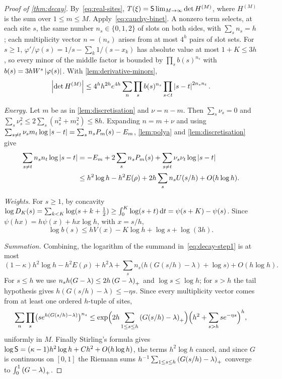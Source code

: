 \begin{proof}[Proof of \cref{thm:decay}]
By~\eqref{eq:real-sites}, $T(\xi)=\mathsf{S}\lim_{M\to\infty}\det H^{(M)}$, where $H^{(M)}$ is the sum
over $1\le m\le M$. Apply~\eqref{eq:cauchy-binet}. A nonzero term selects, at each site $s$, the
same number $n_s\in\{0,1,2\}$ of slots on both sides, with $\sum_sn_s=h$; each multiplicity
vector $n=(n_s)$ arises from at most $4^h$ pairs of slot sets. For $s\ge1$,
$\varphi'/\varphi(s)=1/s-\sum_k1/(s-x_k)$ has absolute value at most $1+K\le3h$, so every minor of
the middle factor is bounded by $\prod_sb(s)^{n_s}$ with $b(s)=3hW^s\left\lvert \varphi(s)\right\rvert$. With
\cref{lem:derivative-minors},
\begin{equation}\label{eq:decay-step1}
  \left\lvert \det H^{(M)}\right\rvert\le4^hh^{2h}e^{4h}\sum_n\prod_sb(s)^{n_s}\prod_{s<t}\left\lvert s-t\right\rvert^{2n_sn_t}.
\end{equation}

\emph{Energy.} Let $m$ be as in \cref{lem:discretisation} and $\nu=n-m$. Then $\sum_s\nu_s=0$ and
$\sum_s\nu_s^2\le2\sum_s(n_s^2+m_s^2)\le8h$. Expanding $n=m+\nu$ and using
$\sum_{s\ne t}\nu_sm_t\log\left\lvert s-t\right\rvert=\sum_sn_sP_m(s)-E_m$, \cref{lem:polya} and
\cref{lem:discretisation} give
\begin{align*}
  \sum_{s\ne t}n_sn_t\log\left\lvert s-t\right\rvert
  &=-E_m+2\sum_sn_sP_m(s)+\sum_{s\ne t}\nu_s\nu_t\log\left\lvert s-t\right\rvert\\
  &\le h^2\log h-h^2E(\rho)+2h\sum_sn_sU(s/h)+O(h\log h).
\end{align*}

\emph{Weights.} For $s\ge1$, by concavity
$\log D_K(s)=\sum_{k<K}\log(s+k+\frac12)\ge\int_0^K\log(s+t)\,\mathrm{d} t=\psi(s+K)-\psi(s)$. Since
$\psi(hx)=h\psi(x)+hx\log h$, with $x=s/h$,
\[
  \log b(s)\le hV(x)-K\log h+\log s+\log(3h).
\]

\emph{Summation.} Combining, the logarithm of the summand in~\eqref{eq:decay-step1} is at most
\[
  (1-\kappa)h^2\log h-h^2E(\rho)+h^2\lambda+\sum_sn_s\bigl(h(G(s/h)-\lambda)+\log s\bigr)+O(h\log h).
\]
For $s\le h$ we use $n_sh(G-\lambda)\le2h\left(G-\lambda\right)_{+}$ and $\log s\le\log h$; for $s>h$ the
tail hypothesis gives $h(G(s/h)-\lambda)\le-\eta s$. Since every multiplicity vector comes from at
least one ordered $h$-tuple of sites,
\[
  \sum_n\prod_s\bigl(se^{h(G(s/h)-\lambda)}\bigr)^{n_s}\le
  \exp\Bigl(2h\sum_{1\le s\le h}\left(G(s/h)-\lambda\right)_{+}\Bigr)\Bigl(h^2+\sum_{s>h}se^{-\eta s}\Bigr)^h,
\]
uniformly in $M$. Finally Stirling's formula gives
$\log\mathsf{S}=(\kappa-1)h^2\log h+Ch^2+O(h\log h)$, the terms $h^2\log h$ cancel, and since $G$ is
continuous on $[0,1]$ the Riemann sums $h^{-1}\sum_{1\le s\le h}\left(G(s/h)-\lambda\right)_{+}$ converge
to $\int_0^1\left(G-\lambda\right)_{+}$.
\end{proof}

